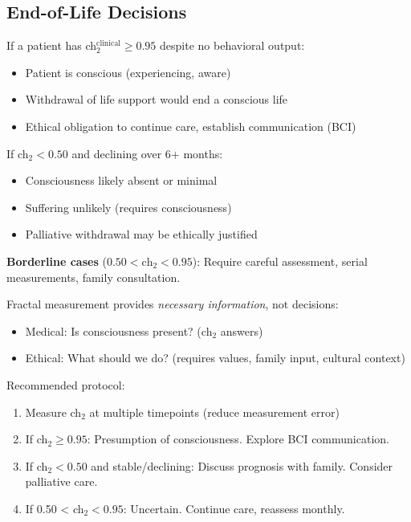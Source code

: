 \subsection{End-of-Life Decisions}

\begin{keyidea}
If a patient has ch$_2^{\text{clinical}} \geq 0.95$ despite no behavioral output:
\begin{itemize}
\item Patient is conscious (experiencing, aware)
\item Withdrawal of life support would end a conscious life
\item Ethical obligation to continue care, establish communication (BCI)
\end{itemize}

If ch$_2 < 0.50$ and declining over 6+ months:
\begin{itemize}
\item Consciousness likely absent or minimal
\item Suffering unlikely (requires consciousness)
\item Palliative withdrawal may be ethically justified
\end{itemize}

\textbf{Borderline cases} ($0.50 < \text{ch}_2 < 0.95$): Require careful assessment, serial measurements, family consultation.
\end{keyidea}

\begin{remark}
Fractal measurement provides \textit{necessary information}, not decisions:
\begin{itemize}
\item Medical: Is consciousness present? (ch$_2$ answers)
\item Ethical: What should we do? (requires values, family input, cultural context)
\end{itemize}

Recommended protocol:
\begin{enumerate}
\item Measure ch$_2$ at multiple timepoints (reduce measurement error)
\item If ch$_2 \geq 0.95$: Presumption of consciousness. Explore BCI communication.
\item If ch$_2 < 0.50$ and stable/declining: Discuss prognosis with family. Consider palliative care.
\item If 0.50 < ch$_2 < 0.95$: Uncertain. Continue care, reassess monthly.
\end{enumerate}
\end{remark}

